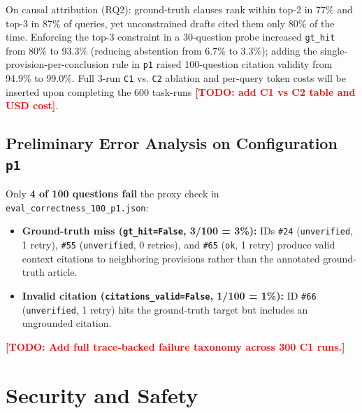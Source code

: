 \documentclass[sigconf,nonacm]{acmart}
\newcommand{\TODO}[1]{\textcolor{red}{\textbf{[TODO: #1]}}}
\begin{document}
On causal attribution (RQ2): ground-truth clauses rank within top-2 in 77\% and top-3 in 87\% of queries, yet unconstrained drafts cited them only 80\% of the time. Enforcing the top-3 constraint in a 30-question probe increased \texttt{gt\_hit} from 80\% to 93.3\% (reducing abstention from 6.7\% to 3.3\%); adding the single-provision-per-conclusion rule in \texttt{p1} raised 100-question citation validity from 94.9\% to 99.0\%. Full 3-run \texttt{C1} vs. \texttt{C2} ablation and per-query token costs will be inserted upon completing the 600 task-runs \TODO{add C1 vs C2 table and USD cost}.

\subsection{Preliminary Error Analysis on Configuration \texttt{p1}}
Only \textbf{4 of 100 questions fail} the proxy check in \texttt{eval\_correctness\_100\_p1.json}:
\begin{itemize}[leftmargin=*]
  \item \textbf{Ground-truth miss (\texttt{gt\_hit=False}, 3/100 = 3\%):} IDs \texttt{\#24} (\texttt{unverified}, 1 retry), \texttt{\#55} (\texttt{unverified}, 0 retries), and \texttt{\#65} (\texttt{ok}, 1 retry) produce valid context citations to neighboring provisions rather than the annotated ground-truth article.
  \item \textbf{Invalid citation (\texttt{citations\_valid=False}, 1/100 = 1\%):} ID \texttt{\#66} (\texttt{unverified}, 1 retry) hits the ground-truth target but includes an ungrounded citation.
\end{itemize}
\TODO{Add full trace-backed failure taxonomy across 300 C1 runs.}

\section{Security and Safety}
\label{sec:security}
\end{document}

